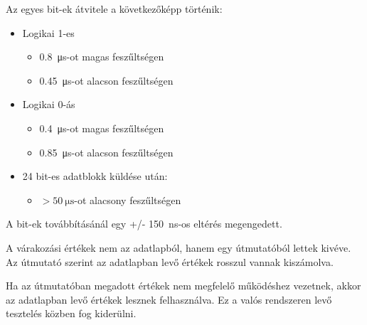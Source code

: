 \tab Az egyes bit-ek átvitele a következőképp történik:

\begin{itemize}
\item Logikai 1-es
	\begin{itemize}
	\item \SI{0.8}{\micro\second}-ot magas feszűltségen
	\item \SI{0.45}{\micro\second}-ot alacson feszűltségen
	\end{itemize}
\item Logikai 0-ás
	\begin{itemize}
	\item \SI{0.4}{\micro\second}-ot magas feszűltségen
	\item \SI{0.85}{\micro\second}-ot alacson feszűltségen
	\end{itemize}
\item 24 bit-es adatblokk küldése után: 
	\begin{itemize}
		\item $ > \SI{50}{\micro\second}$-ot alacsony feszűltségen
	\end{itemize}
\end{itemize}

\tab A bit-ek továbbításánál egy +/- \SI{150}{\nano\second}-os eltérés megengedett.

\tab A várakozási értékek nem az adatlapból, hanem egy útmutatóból\cite{neopixel2019adafruit} lettek kivéve. 
Az útmutató szerint az adatlapban levő értékek rosszul vannak kiszámolva.

\tab Ha az útmutatóban megadott értékek nem megfelelő működéshez vezetnek, akkor az adatlapban\cite{WS2813datasheet} levő értékek lesznek felhasználva. 
Ez a valós rendszeren levő tesztelés közben fog kiderülni.
